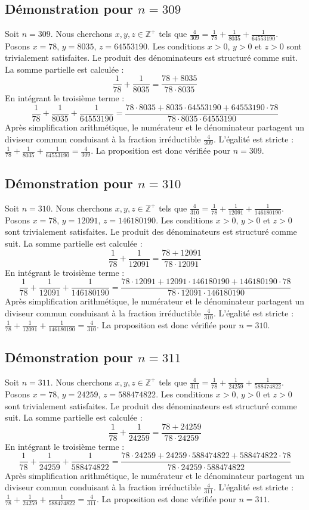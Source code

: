 \documentclass[11pt,a4paper]{article}
\begin{document}
\subsection{Démonstration pour $n = 309$}
Soit $n = 309$. Nous cherchons $x, y, z \in \mathbb{Z}^{+}$ tels que $\frac{4}{309} = \frac{1}{78} + \frac{1}{8035} + \frac{1}{64553190}$.
Posons $x = 78$, $y = 8035$, $z = 64553190$.
Les conditions $x > 0$, $y > 0$ et $z > 0$ sont trivialement satisfaites.
Le produit des dénominateurs est structuré comme suit. La somme partielle est calculée :
$$ \frac{1}{78} + \frac{1}{8035} = \frac{78+8035}{78 \cdot 8035} $$
En intégrant le troisième terme :
$$ \frac{1}{78} + \frac{1}{8035} + \frac{1}{64553190} = \frac{78 \cdot 8035 + 8035 \cdot 64553190 + 64553190 \cdot 78}{78 \cdot 8035 \cdot 64553190} $$
Après simplification arithmétique, le numérateur et le dénominateur partagent un diviseur commun conduisant à la fraction irréductible $\frac{4}{309}$.
L'égalité est stricte : $\frac{1}{78} + \frac{1}{8035} + \frac{1}{64553190} = \frac{4}{309}$.
La proposition est donc vérifiée pour $n = 309$.
\subsection{Démonstration pour $n = 310$}
Soit $n = 310$. Nous cherchons $x, y, z \in \mathbb{Z}^{+}$ tels que $\frac{4}{310} = \frac{1}{78} + \frac{1}{12091} + \frac{1}{146180190}$.
Posons $x = 78$, $y = 12091$, $z = 146180190$.
Les conditions $x > 0$, $y > 0$ et $z > 0$ sont trivialement satisfaites.
Le produit des dénominateurs est structuré comme suit. La somme partielle est calculée :
$$ \frac{1}{78} + \frac{1}{12091} = \frac{78+12091}{78 \cdot 12091} $$
En intégrant le troisième terme :
$$ \frac{1}{78} + \frac{1}{12091} + \frac{1}{146180190} = \frac{78 \cdot 12091 + 12091 \cdot 146180190 + 146180190 \cdot 78}{78 \cdot 12091 \cdot 146180190} $$
Après simplification arithmétique, le numérateur et le dénominateur partagent un diviseur commun conduisant à la fraction irréductible $\frac{4}{310}$.
L'égalité est stricte : $\frac{1}{78} + \frac{1}{12091} + \frac{1}{146180190} = \frac{4}{310}$.
La proposition est donc vérifiée pour $n = 310$.
\subsection{Démonstration pour $n = 311$}
Soit $n = 311$. Nous cherchons $x, y, z \in \mathbb{Z}^{+}$ tels que $\frac{4}{311} = \frac{1}{78} + \frac{1}{24259} + \frac{1}{588474822}$.
Posons $x = 78$, $y = 24259$, $z = 588474822$.
Les conditions $x > 0$, $y > 0$ et $z > 0$ sont trivialement satisfaites.
Le produit des dénominateurs est structuré comme suit. La somme partielle est calculée :
$$ \frac{1}{78} + \frac{1}{24259} = \frac{78+24259}{78 \cdot 24259} $$
En intégrant le troisième terme :
$$ \frac{1}{78} + \frac{1}{24259} + \frac{1}{588474822} = \frac{78 \cdot 24259 + 24259 \cdot 588474822 + 588474822 \cdot 78}{78 \cdot 24259 \cdot 588474822} $$
Après simplification arithmétique, le numérateur et le dénominateur partagent un diviseur commun conduisant à la fraction irréductible $\frac{4}{311}$.
L'égalité est stricte : $\frac{1}{78} + \frac{1}{24259} + \frac{1}{588474822} = \frac{4}{311}$.
La proposition est donc vérifiée pour $n = 311$.
\end{document}
